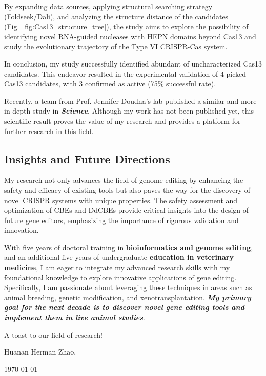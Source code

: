 \documentclass[12pt]{article}
\begin{document}
By expanding data sources, applying structural searching strategy (Foldseek/Dali), 
and analyzing the structure distance of the candidates (Fig.~\ref{fig:Cas13_structure_tree}), 
the study aims to explore the possibility of identifying novel RNA-guided nucleases with HEPN domains 
beyond Cas13 and study the evolutionary trajectory of the Type VI CRISPR-Cas system.

In conclusion, my study successfully identified abundant of uncharacterized Cas13 candidates.
This endeavor resulted in the experimental validation of 4 picked Cas13 candidates, with 3 confirmed as active (75\% successful rate). 

Recently, a team from Prof. Jennifer Doudna's lab published a similar and more in-depth study in \textbf{\textit{Science}}.
Although my work has not been published yet, this scientific result proves the value of my research
and provides a platform for further research in this field.

\subsection*{Insights and Future Directions}

My research not only advances the field of genome editing by enhancing the safety and efficacy of existing tools but also paves the way for the discovery of novel CRISPR systems with unique properties. The safety assessment and optimization of CBEs and DdCBEs provide critical insights into the design of future gene editors, emphasizing the importance of rigorous validation and innovation.

With five years of doctoral training in \textbf{bioinformatics and genome editing},
and an additional five years of undergraduate \textbf{education in veterinary medicine}, 
I am eager to integrate my advanced research skills with my foundational knowledge to explore innovative applications of gene editing. 
Specifically, I am passionate about leveraging these techniques in areas such as animal breeding, 
genetic modification, and xenotransplantation. 
\textbf{\textit{My primary goal for the next decade is to discover novel gene editing tools and implement them in live animal studies}}.

A toast to our field of research!

\hfill Huanan Herman Zhao,

\hfill \today
\end{document}
